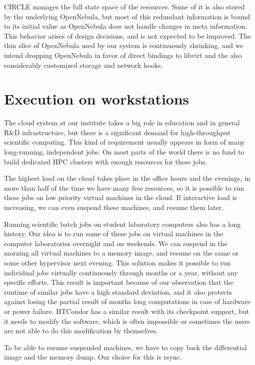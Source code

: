 \documentclass{llncs}
\begin{document}
CIRCLE manages the full state space of the resources. Some of it is also stored by the underlying OpenNebula, but most of this redundant information is bound to its initial value as OpenNebula does not handle changes in meta information. This behavior arises of design decisions, and is not expected to be improved. The thin slice of OpenNebula used by our system is continuously shrinking, and we intend dropping OpenNebula in favor of direct bindings to libvirt and the also considerably customized storage and network hooks.
\section{Execution on workstations}
The cloud system at our institute takes a big role in education and in general R{\&}D infrastructure, but there is a significant demand for high-throughput scientific computing. This  kind of requirement usually appears in form of many long-running, independent jobs. On most parts of the world there is no fund to build dedicated HPC clusters with enough resources for these jobs.

The highest load on the cloud takes place in the office hours and the evenings, in more than half of the time we have many free resources, so it is possible to run these jobs on low priority virtual machines in the cloud. If interactive load is increasing, we can even suspend these machines, and resume them later.

Running scientific batch jobs on student laboratory computers also has a long history. Our idea is to run some of these jobs on virtual machines in the computer laboratories overnight and on weekends. We can suspend in the morning all virtual machines to a memory image, and resume on the same or some other hypervisor next evening. This solution makes it possible to run individual jobs virtually continuously through months or a year, without any specific efforts. This result is important because of our observation that the runtime of similar jobs have a high standard deviation, and it also protects against losing the partial result of months long computations in case of hardware or power failure. HTCondor has a similar result with its checkpoint support, but it needs to modify the software, which is often impossible or sometimes the users are not able to do this modification by themselves. 

To be able to resume suspended machines, we have to copy back the differential image and the memory dump. Our choice for this is rsync.
\end{document}
